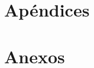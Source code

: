\documentclass[letterpaper,11pt]{upiita}
\begin{document}

\setcounter{secnumdepth}{-1}

\newpage
{}
\backmatter
\part{Apéndices}
\appendix



\part{Anexos}
\anexo



\newpage
\IndiceAlfabetico
\end{document}
